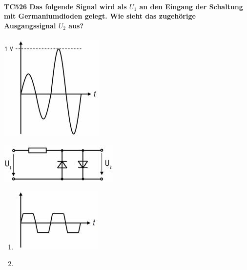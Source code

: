 \documentclass[8pt]{article}
\begin{document}
\begin{enumerate}
\begin{enumerate}[nolistsep,label=\Alph*]
{\begin{enumerate}[nolistsep,label=\Alph*]
\paragraph*{TC526 Das folgende Signal wird als $U_{1}$ an den Eingang der Schaltung mit Germaniumdioden gelegt. Wie sieht das zugehörige Ausgangssignal $U_{2}$ aus?}
	\begin{center}
		\begin{minipage}{\linewidth}
			\centering
			\includegraphics[scale=1.0]{pics/tc526_a.jpg}
		\end{minipage}
	\end{center}
	\begin{center}
		\begin{minipage}{\linewidth}
			\centering
			\includegraphics[scale=1.0]{pics/tc526_b.jpg}
		\end{minipage}
	\end{center}
\begin{enumerate}[nolistsep,label=\Alph*]
\item
	\begin{center}
		\begin{minipage}{\linewidth}
			\centering
			\includegraphics[scale=1.0]{pics/tc526_c.jpg}
		\end{minipage}
	\end{center}
\item
	\begin{center}
		\begin{minipage}{\linewidth}

\end{minipage}
\end{center}
\end{enumerate}
\end{enumerate}}
\end{enumerate}
\end{enumerate}
\end{document}
